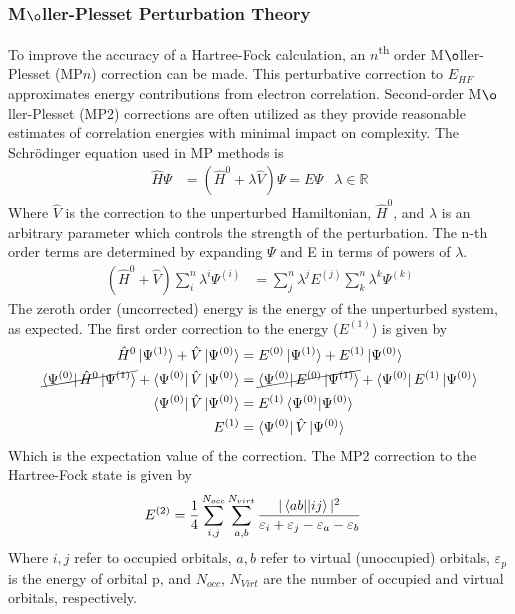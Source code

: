 \documentclass[letterpaper, 12pt]{article}
\begin{document}
\subsubsection{M$\o$ller-Plesset Perturbation Theory}
To improve the accuracy of a Hartree-Fock calculation, an $n$\textsuperscript{th} order M$\o$ller-Plesset (MP$n$) correction can be made. This perturbative correction to $E_{HF}$ approximates energy contributions from electron correlation. \cite{SO} Second-order M$\o$ller-Plesset (MP2) corrections are often utilized as they provide reasonable estimates of correlation energies with minimal impact on complexity. 
The Schr\"{o}dinger equation used in MP methods is
\begin{align}
\hat{H}\Psi&=(\hat{H}^0 +\lambda \hat{V}) \Psi=E\Psi &\lambda \in \mathbb{R}
\end{align} 
Where $\hat{V}$ is the correction to the unperturbed Hamiltonian, $\hat{H}^0$, and $\lambda$ is an arbitrary parameter which controls the strength of the perturbation. The n-th order terms are determined by expanding $\Psi$ and E in terms of powers of $\lambda$.
\begin{align}
(\hat{H}^0 + \hat{V}) \sum\limits_i^n \lambda^i \Psi^{(i)} &= \sum\limits_j^n \lambda^j E^{(j)} \sum\limits_k^n \lambda^k \Psi^{(k)}  
\end{align}
The zeroth order (uncorrected) energy is the energy of the unperturbed system, as expected. The first order correction to the energy ($E^{(1)}$) is given by
\begin{align}
\hat{H}^0 \ket{\Psi^{(1)}} + \hat{V}\ket{\Psi^{(0)}}&=E^{(0)}\ket{\Psi^{(1)}} + E^{(1)}\ket{\Psi^{(0)}}\\
\cancel{\bra{\Psi^{(0)}}\hat{H}^0 \ket{\Psi^{(1)}}} + \bra{\Psi^{(0)}}\hat{V}\ket{\Psi^{(0)}} &=\cancel{\bra{\Psi^{(0)}}E^{(0)}\ket{\Psi^{(1)}}} +\bra{\Psi^{(0)}} E^{(1)}\ket{\Psi^{(0)}}\\
\bra{\Psi^{(0)}}\hat{V}\ket{\Psi^{(0)}} &= E^{(1)} \braket{\Psi^{(0)} | \Psi^{(0)}}\\
E^{(1)} &= \bra{\Psi^{(0)}}\hat{V}\ket{\Psi^{(0)}} 
\end{align}
Which is the expectation value of the correction. The MP2 correction to the Hartree-Fock state is given by 
\begin{align}
E^{(2)} &= \frac{1}{4} \sum\limits_{i,j}^{N_{occ}} \sum\limits_{a,b}^{N_{virt}} \frac{|\braket{ab||ij}|^2}{\varepsilon_i + \varepsilon_j -\varepsilon_a-\varepsilon_b}
\end{align} 
Where $i,j$ refer to occupied orbitals, $a, b$ refer to virtual (unoccupied) orbitals, $\varepsilon_p$ is the energy of orbital p,  and $N_{occ}$, $N_{Virt}$ are the number of occupied and virtual orbitals, respectively.
\end{document}
